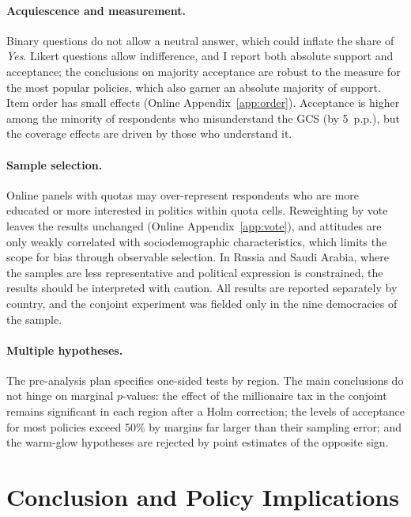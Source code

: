 \documentclass[12pt,english]{article}
\begin{document}
\paragraph{Acquiescence and measurement.} Binary questions do not allow a neutral answer, which could inflate the share of \textit{Yes}. Likert questions allow indifference, and I report both absolute support and acceptance; the conclusions on majority acceptance are robust to the measure for the most popular policies, which also garner an absolute majority of support. Item order has small effects (Online Appendix~\ref{app:order}). Acceptance is higher among the minority of respondents who misunderstand the GCS (by 5~p.p.), but the coverage effects are driven by those who understand it.

\paragraph{Sample selection.} Online panels with quotas may over-represent respondents who are more educated or more interested in politics within quota cells. Reweighting by vote leaves the results unchanged (Online Appendix~\ref{app:vote}), and attitudes are only weakly correlated with sociodemographic characteristics, which limits the scope for bias through observable selection. In Russia and Saudi Arabia, where the samples are less representative and political expression is constrained, the results should be interpreted with caution. All results are reported separately by country, and the conjoint experiment was fielded only in the nine democracies of the sample.

\paragraph{Multiple hypotheses.} The pre-analysis plan specifies one-sided tests by region. The main conclusions do not hinge on marginal $p$-values: the effect of the millionaire tax in the conjoint remains significant in each region after a Holm correction; the levels of acceptance for most policies exceed 50\% by margins far larger than their sampling error; and the warm-glow hypotheses are rejected by point estimates of the opposite sign.

\section{Conclusion and Policy Implications}\label{sec:conclusion}
\end{document}
